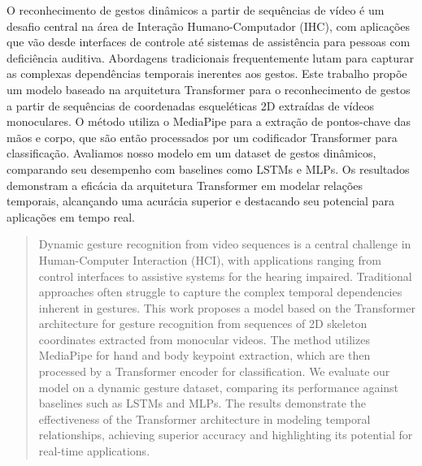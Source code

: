 \documentclass[
	a4paper,      %
	12pt,         %
	english,      %
	oneside,      %
	openany       %
]{abntex2}
\begin{document}
\begin{resumo}
O reconhecimento de gestos dinâmicos a partir de sequências de vídeo é um desafio central na área de Interação Humano-Computador (IHC), com aplicações que vão desde interfaces de controle até sistemas de assistência para pessoas com deficiência auditiva. Abordagens tradicionais frequentemente lutam para capturar as complexas dependências temporais inerentes aos gestos. Este trabalho propõe um modelo baseado na arquitetura Transformer para o reconhecimento de gestos a partir de sequências de coordenadas esqueléticas 2D extraídas de vídeos monoculares. O método utiliza o MediaPipe para a extração de pontos-chave das mãos e corpo, que são então processados por um codificador Transformer para classificação. Avaliamos nosso modelo em um dataset de gestos dinâmicos, comparando seu desempenho com baselines como LSTMs e MLPs. Os resultados demonstram a eficácia da arquitetura Transformer em modelar relações temporais, alcançando uma acurácia superior e destacando seu potencial para aplicações em tempo real.
\end{resumo}

\begin{abstract}
Dynamic gesture recognition from video sequences is a central challenge in Human-Computer Interaction (HCI), with applications ranging from control interfaces to assistive systems for the hearing impaired. Traditional approaches often struggle to capture the complex temporal dependencies inherent in gestures. This work proposes a model based on the Transformer architecture for gesture recognition from sequences of 2D skeleton coordinates extracted from monocular videos. The method utilizes MediaPipe for hand and body keypoint extraction, which are then processed by a Transformer encoder for classification. We evaluate our model on a dynamic gesture dataset, comparing its performance against baselines such as LSTMs and MLPs. The results demonstrate the effectiveness of the Transformer architecture in modeling temporal relationships, achieving superior accuracy and highlighting its potential for real-time applications.
\end{abstract}


\tableofcontents* %


\textual
\end{document}
